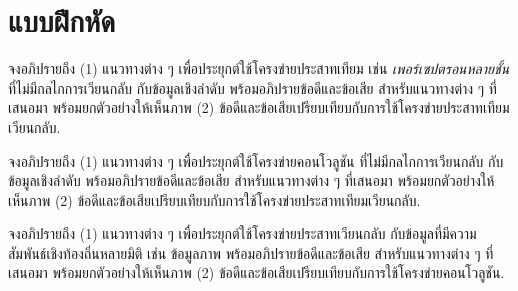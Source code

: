 \section{แบบฝึกหัด}
\label{section: nlp exercises}

\begin{Parallel}[c]{0.5\textwidth}{0.45\textwidth}
\end{Parallel}


\begin{Exercise}
	\label{ex: seq RNN cf ANN}
	
	จงอภิปรายถึง
	(1) แนวทางต่าง ๆ เพื่อประยุกต์ใช้โครงข่ายประสาทเทียม เช่น \textit{เพอร์เซปตรอนหลายชั้น}
	ที่ไม่มีกลไกการเวียนกลับ
	กับข้อมูลเชิงลำดับ
	พร้อมอภิปรายข้อดีและข้อเสีย สำหรับแนวทางต่าง ๆ ที่เสนอมา
	พร้อมยกตัวอย่างให้เห็นภาพ
	(2) ข้อดีและข้อเสียเปรียบเทียบกับการใช้โครงข่ายประสาทเทียมเวียนกลับ.
	
	
\end{Exercise}

\begin{Exercise}
	\label{ex: seq RNN cf CNN}
	

	จงอภิปรายถึง
(1) แนวทางต่าง ๆ เพื่อประยุกต์ใช้โครงข่ายคอนโวลูชัน ที่ไม่มีกลไกการเวียนกลับ
กับข้อมูลเชิงลำดับ
พร้อมอภิปรายข้อดีและข้อเสีย สำหรับแนวทางต่าง ๆ ที่เสนอมา
พร้อมยกตัวอย่างให้เห็นภาพ
(2) ข้อดีและข้อเสียเปรียบเทียบกับการใช้โครงข่ายประสาทเทียมเวียนกลับ.
	
\end{Exercise}


\begin{Exercise}
	\label{ex: seq RNN on 2D data}
	
	
	จงอภิปรายถึง
	(1) แนวทางต่าง ๆ เพื่อประยุกต์ใช้โครงข่ายประสาทเวียนกลับ
	กับข้อมูลที่มีความสัมพันธ์เชิงท้องถิ่นหลายมิติ เช่น ข้อมูลภาพ
	พร้อมอภิปรายข้อดีและข้อเสีย สำหรับแนวทางต่าง ๆ ที่เสนอมา
	พร้อมยกตัวอย่างให้เห็นภาพ
	(2) ข้อดีและข้อเสียเปรียบเทียบกับการใช้โครงข่ายคอนโวลูชัน.
	
\end{Exercise}


